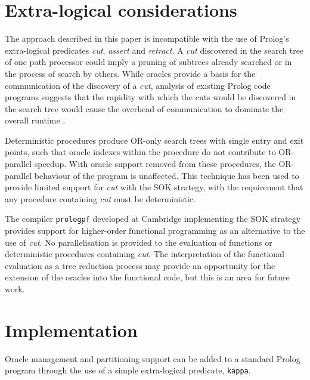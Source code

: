 \documentclass[a4paper,11pt,twoside]{article}
\begin{document}
\section{Extra-logical considerations} %

The approach described in this paper is incompatible with the use of Prolog's
extra-logical predicates \textit{cut}, \textit{assert} and \textit{retract}.
A \textit{cut} discovered in the search tree of one path processor could imply
a pruning of subtrees already searched or in the process of search by others.
While oracles provide a basis for the communication of the discovery of a
\textit{cut}, analysis of existing Prolog code programs suggests that the
rapidity with which the cuts would be discovered in the search tree would cause
the overhead of communication to dominate the overall runtime \cite{Lew98}.

Deterministic procedures produce OR-only search trees with single entry and
exit points, such that oracle indexes within the procedure do not contribute
to OR-parallel speedup.  With oracle support removed from these procedures, the
OR-parallel behaviour of the program is unaffected.  This technique has been
used to provide limited support for \textit{cut} with the SOK strategy, with the
requirement that any procedure containing \textit{cut} must be deterministic.

The compiler \texttt{prologpf} developed at Cambridge implementing the
SOK strategy provides support for higher-order functional programming as an
alternative to the use of \textit{cut}.  No parallelisation is provided to
the evaluation of functions or
deterministic procedures containing \textit{cut}.  The interpretation of the
functional evaluation as a tree reduction process may provide an opportunity for
the extension of the oracles into the functional code, but this is an area for future
work.

\section{Implementation} %
\label{implementation}

Oracle management and partitioning support can be added to a standard Prolog
program through the use of a simple extra-logical predicate, \texttt{kappa}.
\end{document}
